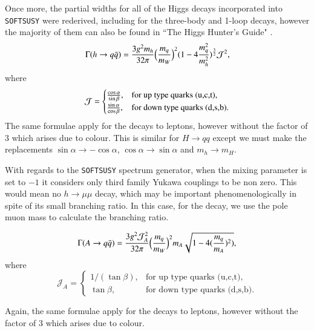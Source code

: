 \documentclass[final,3p,times]{elsarticle}
\begin{document}
Once more, the partial widths for all of the Higgs decays incorporated into {\tt SOFTSUSY} were rederived, including for the three-body and 1-loop decays, however the majority of them can also be found in ``The Higgs Hunter's Guide" \cite{HHG}.
\begin{equation}\label{hqq}
\Gamma (h \rightarrow q \bar{q}) = {3g^2 m_h \over 32\pi} \Big({m_q \over m_W}\Big)^2 (1-4{m_q^2 \over m_h^2})^{3 \over 2} \mathcal{J}^2, 
\end{equation} 
where
\begin{equation}
\mathcal{J}=\begin{cases}
    {\cos \alpha \over \sin \beta}, & \text{for up type quarks (u,c,t)},\\
    {\sin \alpha \over \cos \beta}, & \text{for down type quarks (d,s,b)}.
  \end{cases}
\end{equation}
The same formulae apply for the decays to leptons, however without the factor of 3 which arises due to colour.
This is similar for $H \rightarrow qq$ except we must make the replacements $\sin\alpha \rightarrow -\cos\alpha$, $\cos\alpha \rightarrow \sin\alpha$ and $m_h \rightarrow m_H$.

With regards to the {\tt SOFTSUSY} spectrum generator, when the mixing parameter is set to $-1$ it considers
only third family Yukawa couplings to be non zero. This would mean no $h \rightarrow \mu \mu$ decay, which may be important phenomenologically in spite of its small branching ratio. In this case, for
the decay, we use the pole muon mass to calculate the branching ratio. 

\begin{equation}\label{Aqq}
\Gamma (A \rightarrow q \bar{q}) = {3 g^2 \mathcal{J}_A^2 \over 32\pi} \Big({m_q \over m_W}\Big)^2 m_A \sqrt{1 - 4 ({m_q \over m_A})^2)},
\end{equation} 
where
\begin{equation}
\mathcal{J}_A=\begin{cases}
    1 /(\tan \beta), & \text{for up type quarks (u,c,t)},\\
    \tan \beta, & \text{for down type quarks (d,s,b)}.
  \end{cases}
\end{equation}

Again, the same formulae apply for the decays to leptons, however without the factor of 3 which arises due to colour.
\end{document}

